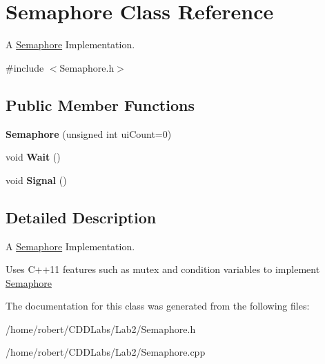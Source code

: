 \hypertarget{classSemaphore}{}\section{Semaphore Class Reference}
\label{classSemaphore}


A \hyperlink{classSemaphore}{Semaphore} Implementation.  




{\ttfamily \#include $<$Semaphore.\+h$>$}

\subsection*{Public Member Functions}
\begin{DoxyCompactItemize}
\item 
{\bfseries Semaphore} (unsigned int ui\+Count=0)\hypertarget{classSemaphore_a0d9290d316636875ca85d1d78950a817}{}\label{classSemaphore_a0d9290d316636875ca85d1d78950a817}

\item 
void {\bfseries Wait} ()\hypertarget{classSemaphore_a72aabebf026e3a8b1f3e4d0fa8ee1eda}{}\label{classSemaphore_a72aabebf026e3a8b1f3e4d0fa8ee1eda}

\item 
void {\bfseries Signal} ()\hypertarget{classSemaphore_a86f92f738b4486439b296d8e235895f2}{}\label{classSemaphore_a86f92f738b4486439b296d8e235895f2}

\end{DoxyCompactItemize}


\subsection{Detailed Description}
A \hyperlink{classSemaphore}{Semaphore} Implementation. 

Uses C++11 features such as mutex and condition variables to implement \hyperlink{classSemaphore}{Semaphore} 

The documentation for this class was generated from the following files\+:\begin{DoxyCompactItemize}
\item 
/home/robert/\+C\+D\+D\+Labs/\+Lab2/Semaphore.\+h\item 
/home/robert/\+C\+D\+D\+Labs/\+Lab2/Semaphore.\+cpp\end{DoxyCompactItemize}
